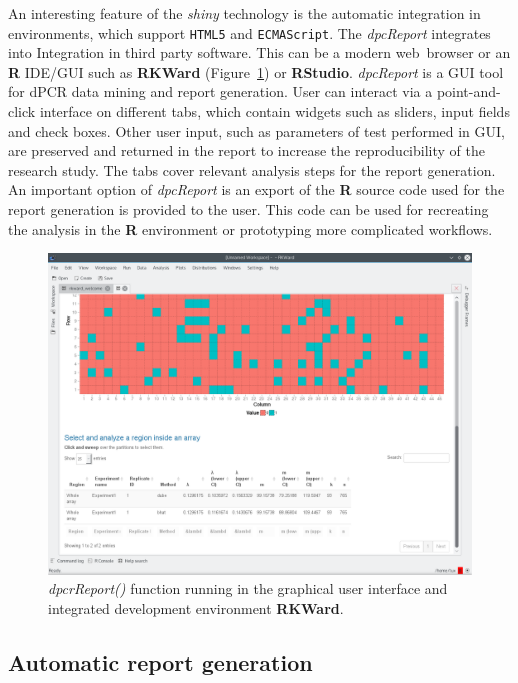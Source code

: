 \documentclass[a4,center,fleqn]{NAR}
\begin{document}
An interesting feature of the \textit{shiny} 
technology is the automatic integration in environments, which support 
\texttt{HTML5} and \texttt{ECMAScript}. The \textit{dpcReport} integrates into 
Integration in third party software. This can be a modern web~browser or an 
\textbf{R} IDE/GUI such as \textbf{RKWard} (Figure~\ref{GUI_RKWard_1}) 
\cite{rodiger_rkward_2012} or \textbf{RStudio}. \textit{dpcReport} is a GUI tool 
for dPCR data mining and report generation. User can interact via a 
point-and-click interface on different tabs, which contain widgets such as 
sliders, input fields and check boxes. Other 
user input, such as parameters of test performed in GUI, are preserved and 
returned in the report to increase the reproducibility of the research study. 
The tabs cover relevant analysis steps for the report generation. An important 
option of \textit{dpcReport} is an export of the \textbf{R} source code used for 
the report generation is provided to the user. This code can be used for 
recreating the analysis in the \textbf{R} environment or prototyping more 
complicated workflows.


\begin{figure}[t]
\begin{center}
\includegraphics[width=17cm]{GUI_RKWard_1.png}
\end{center}
\caption{\textit{dpcrReport()} function running in the graphical user interface and integrated development environment \textbf{RKWard}.}
\label{GUI_RKWard_1}
\end{figure}

\subsection{Automatic report generation}
\end{document}
